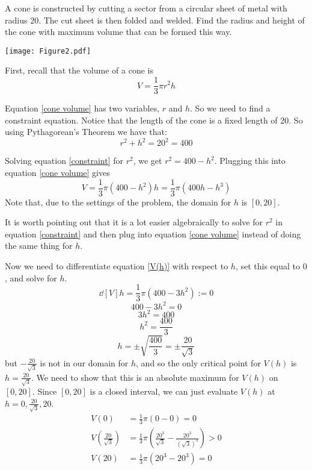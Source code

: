 \documentclass[handout,nooutcomes]{ximera}
\begin{document}
\begin{problem}
A cone is constructed by cutting a sector from a circular sheet of metal with radius 20.  The cut sheet is then folded and welded.  Find the radius and height of the cone with maximum volume that can be formed this way.

	\begin{image}
	\texttt{[image: Figure2.pdf]}
	\end{image}
	
		\begin{freeResponse}
		First, recall that the volume of a cone is
		\begin{equation}\label{cone volume}
		V = \frac{1}{3} \pi r^2 h
		\end{equation}
		
		Equation \eqref{cone volume} has two variables, $r$ and $h$.  
		So we need to find a constraint equation.  
		Notice that the length of the cone is a fixed length of 20.  
		So using Pythagorean's Theorem we have that:
		\begin{equation}\label{constraint}
		r^2 + h^2 = 20^2 = 400
		\end{equation}
		
		Solving equation \eqref{constraint} for $r^2$, we get $r^2 = 400 - h^2$.  
		Plugging this into equation \eqref{cone volume} gives
		\begin{equation}\label{V(h)}
		V = \frac{1}{3} \pi (400-h^2) h = \frac{1}{3} \pi (400h - h^3) 
		\end{equation}
		Note that, due to the settings of the problem, the domain for $h$ is $[0,20]$.  
		
		It is worth pointing out that it is a lot easier algebraically to solve for $r^2$ in equation \eqref{constraint} 
		and then plug into equation \eqref{cone volume} instead of doing the same thing for $h$.
		
		Now we need to differentiate equation \eqref{V(h)} with respect to $h$, set this equal to $0$, and solve for $h$.
		$$ \dd[V]{h} = \frac{1}{3} \pi (400 - 3h^2) := 0 $$
		$$ 400 - 3h^2 = 0 $$
		$$ 3h^2 = 400 $$
		$$ h^2 = \frac{400}{3} $$
		$$ h = \pm \sqrt{\frac{400}{3}} = \pm \frac{20}{\sqrt{3}} $$
		but $- \frac{20}{\sqrt{3}}$ is not in our domain for $h$, and so the only critical point for $V(h)$ is $h = \frac{20}{\sqrt{3}}$.  
		We need to show that this is an absolute maximum for $V(h)$ on $[0,20]$.  
		Since $[0,20]$ is a closed interval, we can just evaluate $V(h)$ at $h=0, \frac{20}{\sqrt{3}}, 20$.  
		\begin{align}
		V(0) &= \frac{1}{3} \pi (0-0) = 0 \\
		V \left( \frac{20}{\sqrt{3}} \right) &= \frac{1}{3} \pi \left( \frac{20^3}{\sqrt{3}} - \frac{20^3}{\left( \sqrt{3} \right)^3} \right) > 0 \label{inequality} \\
		V(20) &= \frac{1}{3} \pi (20^3 - 20^3) = 0 
		\end{align}
		

\end{freeResponse}
\end{problem}
\end{document}
